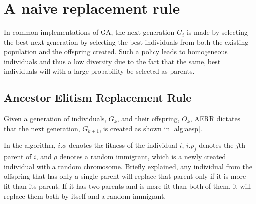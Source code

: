 \section{A naive replacement rule}
In common implementations of GA, the next generation $G_{i}$ is made by selecting the best  next generation by selecting the best individuals from both the existing population and the offspring created. Such a policy leads to homogeneous individuals and thus a low diversity due to the fact that the same, best individuals will with a large probability be selected as parents.


\subsection{Ancestor Elitism Replacement Rule}
Given a generation of individuals, $G_k$, and their offspring, $O_k$, AERR dictates that the next generation, $G_{k+1}$, is created as shown in \cref{alg:aesp}.
%

%
In the algorithm, $i.\phi$ denotes the fitness of the individual $i$, $i.p_j$ denotes the $j$th parent of $i$, and $\rho$ denotes a random immigrant, which is a newly created individual with a random chromosome.
Briefly explained, any individual from the offspring that has only a single parent will replace that parent only if it is more fit than its parent. If it has two parents and is more fit than both of them, it will replace them both by itself and a random immigrant.

